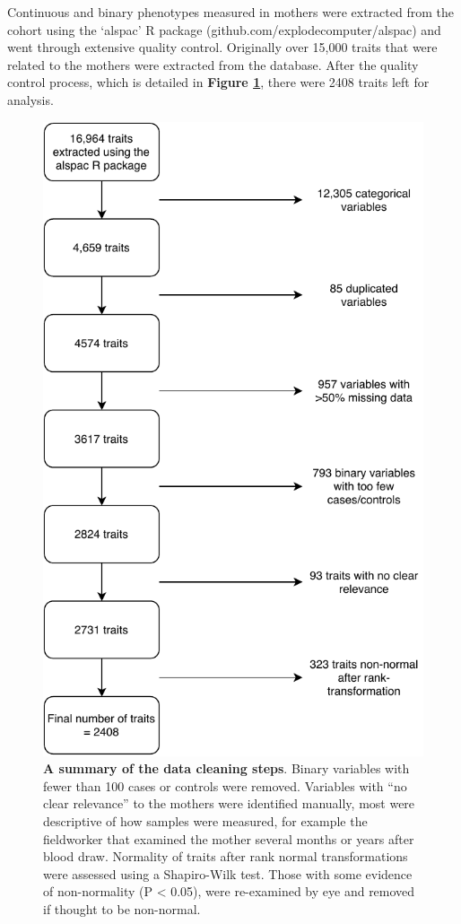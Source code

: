 \documentclass[11pt,oneside]{bristolthesis}
\begin{document}
Continuous and binary phenotypes measured in mothers were extracted from the cohort using the `alspac' R package (github.com/explodecomputer/alspac) and went through extensive quality control. Originally over 15,000 traits that were related to the mothers were extracted from the database. After the quality control process, which is detailed in \textbf{Figure \ref{fig:h2ewas-pheno-qc}}, there were 2408 traits left for analysis.




\begin{figure}

{\centering \includegraphics[width=0.75\linewidth,height=0.75\textheight]{figure/05-h2ewas/m2_data_cleaning} 

}

\caption[A summary of the data cleaning steps]{\textbf{A summary of the data cleaning steps}. Binary variables with fewer than 100 cases or controls were removed. Variables with ``no clear relevance'' to the mothers were identified manually, most were descriptive of how samples were measured, for example the fieldworker that examined the mother several months or years after blood draw. Normality of traits after rank normal transformations were assessed using a Shapiro-Wilk test. Those with some evidence of non-normality (P \textless{} 0.05), were re-examined by eye and removed if thought to be non-normal.}\label{fig:h2ewas-pheno-qc}
\end{figure}
\end{document}
